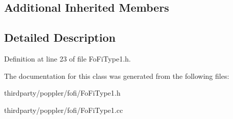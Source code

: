 \subsection*{Additional Inherited Members}


\subsection{Detailed Description}


Definition at line 23 of file Fo\+Fi\+Type1.\+h.



The documentation for this class was generated from the following files\+:\begin{DoxyCompactItemize}
\item 
thirdparty/poppler/fofi/Fo\+Fi\+Type1.\+h\item 
thirdparty/poppler/fofi/Fo\+Fi\+Type1.\+cc\end{DoxyCompactItemize}
